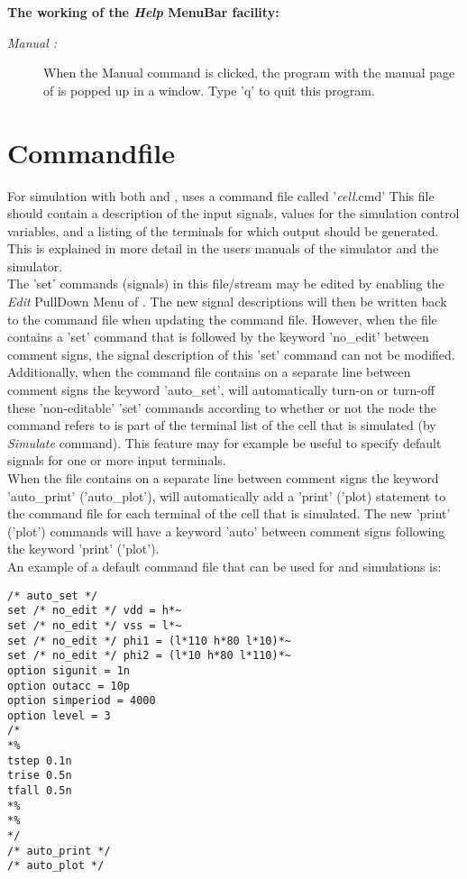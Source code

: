 {\bf The working of the {\it Help} MenuBar facility:}
\begin{description}
\item [{\it Manual :}]
When the Manual command is clicked,
the program  with the manual page of  is popped up in a window.
Type 'q' to quit this program.
\end{description}

\section{Commandfile}
For simulation with both  and ,
 uses a command file called '{\it cell}.cmd'
This file should contain a description
of the input signals, values for the simulation control variables,
and a listing of the terminals for which output should be generated.
This is explained in more detail in the users manuals of
the  simulator and the  simulator.
\\
The 'set' commands (signals) in this file/stream
may be edited by enabling the {\it Edit} PullDown Menu of
.
The new signal descriptions will then be written back
to the command file when updating
the command file.
However,
when the file contains a 'set' command that is followed by
the keyword 'no\_edit' between comment signs,
the signal description of this 'set' command can not be modified.
Additionally,
when the command file contains on a separate line
between comment signs the keyword 'auto\_set',
will automatically turn-on or turn-off these 'non-editable' 
'set' commands according to whether or not
the node the command refers to is part of the terminal list
of the cell that is simulated (by {\it Simulate} command).
This feature may for example be useful to specify default signals for
one or more input terminals.
\\
When the file contains on a separate line
between comment signs the keyword 'auto\_print' ('auto\_plot'),
will automatically add a 'print' ('plot) statement to the
command file for each terminal of the cell that is simulated.
The new 'print' ('plot') commands will have a keyword 'auto' between
comment signs following the keyword 'print' ('plot').
\\
An example of a default command file that can be used for
 and  simulations is:
\begin{verbatim}
/* auto_set */
set /* no_edit */ vdd = h*~
set /* no_edit */ vss = l*~
set /* no_edit */ phi1 = (l*110 h*80 l*10)*~
set /* no_edit */ phi2 = (l*10 h*80 l*110)*~
option sigunit = 1n
option outacc = 10p
option simperiod = 4000
option level = 3
/*
*%
tstep 0.1n
trise 0.5n
tfall 0.5n
*%
*%
*/
/* auto_print */
/* auto_plot */
\end{verbatim}

